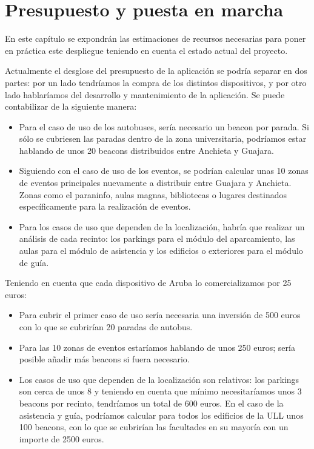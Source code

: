 %
%
%

\chapter{Presupuesto y puesta en marcha} \label{chap:presupuesto} 

En este capítulo se expondrán las estimaciones de recursos necesarias para poner en práctica este despliegue teniendo en cuenta el estado actual del proyecto. 

Actualmente el desglose del presupuesto de la aplicación se podría separar en dos partes: por un lado tendríamos la compra de los distintos dispositivos, y por otro lado hablaríamos del desarrollo y mantenimiento de la aplicación. Se puede contabilizar de la siguiente manera: 

\begin{itemize}
\item Para el caso de uso de los autobuses, sería necesario un beacon por parada. Si sólo se cubriesen las paradas dentro de la zona universitaria, podríamos estar hablando de unos 20 beacons distribuidos entre Anchieta y Guajara.
\item Siguiendo con el caso de uso de los eventos, se podrían calcular unas 10 zonas de eventos principales nuevamente a distribuir entre Guajara y Anchieta. Zonas como el paraninfo, aulas magnas, bibliotecas o lugares destinados específicamente para la realización de eventos.
\item Para los casos de uso que dependen de la localización, habría que realizar un análisis de cada recinto: los parkings para el módulo del aparcamiento, las aulas para el módulo de asistencia y los edificios o exteriores para el módulo de guía.
\end{itemize}

Teniendo en cuenta que cada dispositivo de Aruba lo comercializamos por 25 euros:

 
\begin{itemize}
\item Para cubrir el primer caso de uso sería necesaria una inversión de 500 euros con lo que se cubrirían 20 paradas de autobus.
\item Para las 10 zonas de eventos estaríamos hablando de unos 250 euros; sería posible añadir más beacons si fuera necesario.
\item Los casos de uso que dependen de la localización son relativos: los parkings son cerca de unos 8 y teniendo en cuenta que mínimo necesitaríamos unos 3 beacons por recinto, tendríamos un total de 600 euros. En el caso de la asistencia y guía, podríamos calcular para todos los edificios de la ULL unos 100 beacons, con lo que se cubrirían las facultades en su mayoría con un importe de 2500 euros.
\end{itemize}


